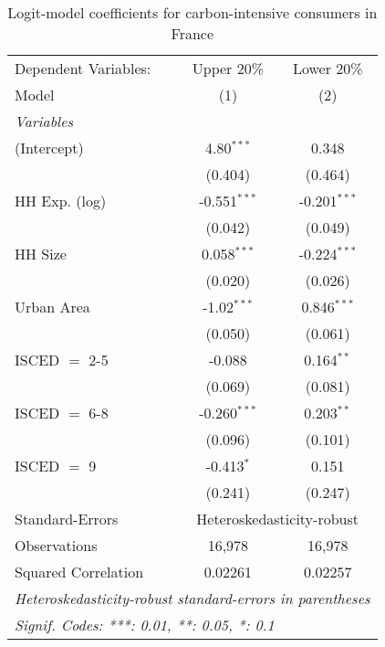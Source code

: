 
\begin{table}[htbp!]
   \centering
   \small
   \begin{adjustbox}{width = 1\textwidth, max height = 0.95\textheight, center}
      \begin{threeparttable}[b]
         \caption{\label{tab:Logit_1_FRA} Logit-model coefficients for carbon-intensive consumers in France}
         \begin{tabular}{lcc}
            \tabularnewline \midrule \midrule
            Dependent Variables: & Upper 20\%     & Lower 20\%\\   
            Model                & (1)            & (2)\\  
            \midrule
            \emph{Variables}\\
            (Intercept)          & 4.80$^{***}$   & 0.348\\   
                                 & (0.404)        & (0.464)\\   
            HH Exp. (log)        & -0.551$^{***}$ & -0.201$^{***}$\\   
                                 & (0.042)        & (0.049)\\   
            HH Size              & 0.058$^{***}$  & -0.224$^{***}$\\   
                                 & (0.020)        & (0.026)\\   
            Urban Area           & -1.02$^{***}$  & 0.846$^{***}$\\   
                                 & (0.050)        & (0.061)\\   
            ISCED $=$ 2-5        & -0.088         & 0.164$^{**}$\\   
                                 & (0.069)        & (0.081)\\   
            ISCED $=$ 6-8        & -0.260$^{***}$ & 0.203$^{**}$\\   
                                 & (0.096)        & (0.101)\\   
            ISCED $=$ 9          & -0.413$^{*}$   & 0.151\\   
                                 & (0.241)        & (0.247)\\   
            \midrule 
            Standard-Errors & \multicolumn{2}{c}{Heteroskedasticity-robust} \\ 
            Observations         & 16,978         & 16,978\\  
            Squared Correlation  & 0.02261        & 0.02257\\  
            \midrule \midrule
            \multicolumn{3}{l}{\emph{Heteroskedasticity-robust standard-errors in parentheses}}\\
            \multicolumn{3}{l}{\emph{Signif. Codes: ***: 0.01, **: 0.05, *: 0.1}}\\
         \end{tabular}
         

\end{threeparttable}
\end{adjustbox}
\end{table}
